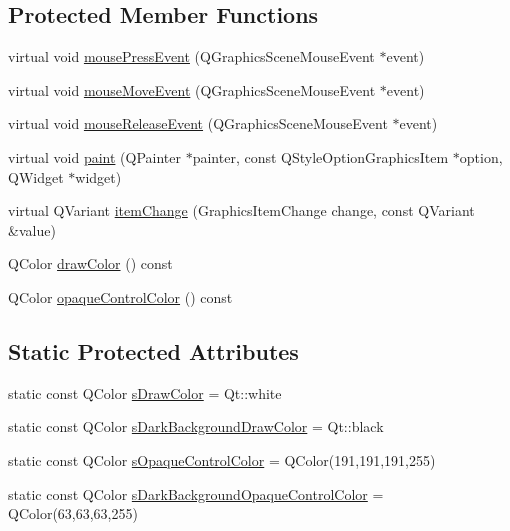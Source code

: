 \subsection*{Protected Member Functions}
\begin{DoxyCompactItemize}
\item 
virtual void \hyperlink{class_u_b_graphics_curtain_item_a65fc9514c0c343a72a636d719f3175f3}{mouse\-Press\-Event} (Q\-Graphics\-Scene\-Mouse\-Event $\ast$event)
\item 
virtual void \hyperlink{class_u_b_graphics_curtain_item_af05a99fa2b712eee82bf24ad13ea8818}{mouse\-Move\-Event} (Q\-Graphics\-Scene\-Mouse\-Event $\ast$event)
\item 
virtual void \hyperlink{class_u_b_graphics_curtain_item_a9fdaec07d9e9ceb2797c75b63a3be45d}{mouse\-Release\-Event} (Q\-Graphics\-Scene\-Mouse\-Event $\ast$event)
\item 
virtual void \hyperlink{class_u_b_graphics_curtain_item_a49ccb0c184f7a9db3324b78f019002b9}{paint} (Q\-Painter $\ast$painter, const Q\-Style\-Option\-Graphics\-Item $\ast$option, Q\-Widget $\ast$widget)
\item 
virtual Q\-Variant \hyperlink{class_u_b_graphics_curtain_item_ad400cfdbe0a2a98f91335112cf32e120}{item\-Change} (Graphics\-Item\-Change change, const Q\-Variant \&value)
\item 
Q\-Color \hyperlink{class_u_b_graphics_curtain_item_abc4934ef6b405340923ca34dcb7948ad}{draw\-Color} () const 
\item 
Q\-Color \hyperlink{class_u_b_graphics_curtain_item_abe9776e1ad6b992648454a1df61c5db2}{opaque\-Control\-Color} () const 
\end{DoxyCompactItemize}
\subsection*{Static Protected Attributes}
\begin{DoxyCompactItemize}
\item 
static const Q\-Color \hyperlink{class_u_b_graphics_curtain_item_a39534e46257349d87fa9902b7a38b470}{s\-Draw\-Color} = Qt\-::white
\item 
static const Q\-Color \hyperlink{class_u_b_graphics_curtain_item_a5260196daa4e1d00427797c585aeaaac}{s\-Dark\-Background\-Draw\-Color} = Qt\-::black
\item 
static const Q\-Color \hyperlink{class_u_b_graphics_curtain_item_ad4107abd347a599bd47e892f30dc8d08}{s\-Opaque\-Control\-Color} = Q\-Color(191,191,191,255)
\item 
static const Q\-Color \hyperlink{class_u_b_graphics_curtain_item_a0364030708ad1c7aaee23912349f4681}{s\-Dark\-Background\-Opaque\-Control\-Color} = Q\-Color(63,63,63,255)
\end{DoxyCompactItemize}
